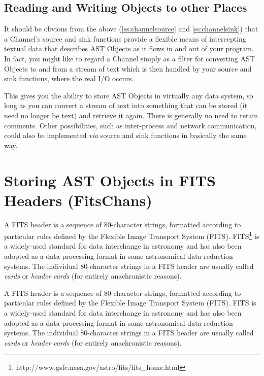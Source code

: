 \documentclass[twoside,11pt]{article}
\newcommand{\htmladdnormallink}[2]{#1}
\newenvironment{latexonly}{}{}
\newcommand{\htmlref}[2]{#1}
\newcommand{\secref}[1]{\S\ref{#1}}
\renewcommand{\secref}[1]{\ref{#1}}
\begin{document}
\subsection{\label{ss:otherplaces}Reading and Writing Objects to other Places}

It should be obvious from the above (\secref{ss:channelsource} and
\secref{ss:channelsink}) that a \htmlref{Channel}{Channel}'s source and sink functions
provide a flexible means of intercepting textual data that describes
AST Objects as it flows in and out of your program. In fact, you might
like to regard a Channel simply as a filter for converting AST Objects
to and from a stream of text which is then handled by your source and
sink functions, where the real I/O occurs.

This gives you the ability to store AST Objects in virtually any data
system, so long as you can convert a stream of text into something
that can be stored (it need no longer be text) and retrieve it
again. There is generally no need to retain comments.  Other
possibilities, such as inter-process and network communication, could
also be implemented {\em{via}} source and sink functions in basically
the same way.

\cleardoublepage
\section{\label{ss:nativefits}Storing AST Objects in FITS Headers (FitsChans)}

\begin{latexonly}
A FITS header is a sequence of 80-character strings, formatted
according to particular rules defined by the Flexible Image Transport
\htmlref{System}{System}
(FITS). FITS\footnote{http://www.gsfc.nasa.gov/astro/fits/fits\_home.html}
is a widely-used standard for data interchange in astronomy and has
also been adopted as a data processing format in some astronomical
data reduction systems.  The individual 80-character strings in a FITS
header are usually called {\em{cards}} or {\em{header cards}} (for
entirely anachronistic reasons).
\end{latexonly}
\begin{htmlonly}
A FITS header is a sequence of 80-character strings, formatted
according to particular rules defined by the Flexible Image Transport
System (FITS).
\htmladdnormallink{FITS}{http://www.gsfc.nasa.gov/astro/fits/fits_home.html}
is a widely-used standard for data interchange in astronomy and has
also been adopted as a data processing format in some astronomical
data reduction systems.  The individual 80-character strings in a FITS
header are usually called {\em{cards}} or {\em{header cards}} (for
entirely anachronistic reasons).
\end{htmlonly}
\end{document}
